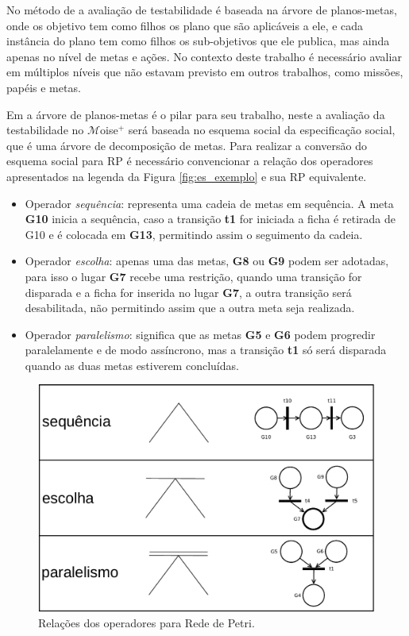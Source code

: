 No método de \cite{winikoff2014testability,winikoff2017bdi} a avaliação de testabilidade é baseada na árvore de planos-metas, onde os objetivo tem como filhos os plano que são aplicáveis a ele, e cada instância do plano tem como filhos os sub-objetivos que ele publica, mas ainda apenas no nível de metas e ações. No contexto deste trabalho é necessário avaliar em múltiplos níveis que não estavam previsto em outros trabalhos, como missões, papéis e metas.

Em \cite{winikoff2014testability} a árvore de planos-metas é o pilar para seu trabalho, neste a avaliação da testabilidade no $\mathcal{M}$oise$^{+}$ será baseada no esquema social da especificação social, que é uma árvore de decomposição de metas. Para realizar a conversão do esquema social para RP é necessário convencionar a relação dos operadores apresentados na legenda da Figura \ref{fig:es_exemplo} e sua RP equivalente.

\begin{itemize}

\item Operador \textit{sequência}: representa uma cadeia de metas em sequência. A meta \textbf{G10} inicia a sequência, caso a transição \textbf{t1} for iniciada a ficha é retirada de G10 e é colocada em \textbf{G13}, permitindo assim o seguimento da cadeia. 

\item Operador \textit{escolha}: apenas uma das metas, \textbf{G8} ou \textbf{G9} podem ser adotadas, para isso o lugar \textbf{G7} recebe uma restrição, quando uma transição for disparada e a ficha for inserida no lugar \textbf{G7}, a outra transição será desabilitada, não permitindo assim que a outra meta seja realizada. 

\item Operador \textit{paralelismo}: significa que as metas \textbf{G5} e \textbf{G6} podem progredir paralelamente e de modo assíncrono, mas a transição \textbf{t1} só será disparada quando as duas metas estiverem concluídas.

\end{itemize}

\begin{figure}[ht]
\centering
\includegraphics[scale=0.4]{imagens/4-relacao-moise-rp.pdf}
\caption{Relações dos operadores para Rede de Petri.}
\label{fig:moise_rp}
\end{figure}

